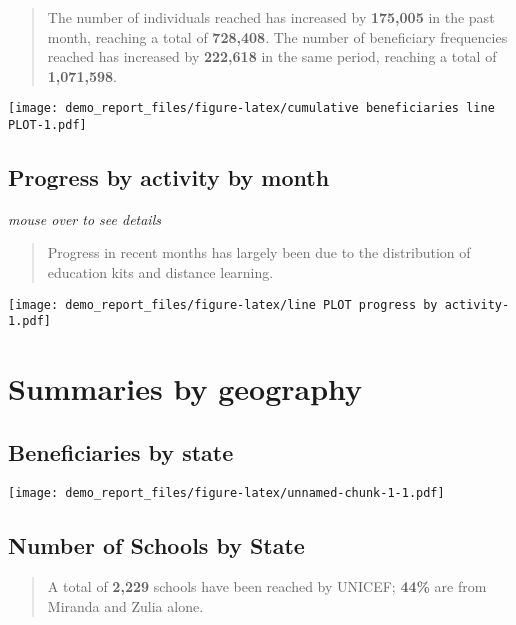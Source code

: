 \documentclass[
]{article}
\begin{document}
\begin{quote}
The number of individuals reached has increased by \textbf{175,005} in
the past month, reaching a total of \textbf{728,408}. The number of
beneficiary frequencies reached has increased by \textbf{222,618} in the
same period, reaching a total of \textbf{1,071,598}.
\end{quote}

\texttt{[image: demo\_report\_files/figure-latex/cumulative beneficiaries line PLOT-1.pdf]}

\hypertarget{progress-by-activity-by-month}{%
\subsection{Progress by activity by
month}\label{progress-by-activity-by-month}}

\emph{mouse over to see details}

\begin{quote}
Progress in recent months has largely been due to the distribution of
education kits and distance learning.
\end{quote}

\texttt{[image: demo\_report\_files/figure-latex/line PLOT progress by activity-1.pdf]}

\hypertarget{summaries-by-geography}{%
\section{Summaries by geography}\label{summaries-by-geography}}

\hypertarget{beneficiaries-by-state}{%
\subsection{Beneficiaries by state}\label{beneficiaries-by-state}}

\texttt{[image: demo\_report\_files/figure-latex/unnamed-chunk-1-1.pdf]}

\hypertarget{number-of-schools-by-state}{%
\subsection{Number of Schools by
State}\label{number-of-schools-by-state}}

\begin{quote}
A total of \textbf{2,229} schools have been reached by UNICEF;
\textbf{44\%} are from Miranda and Zulia alone.
\end{quote}
\end{document}
